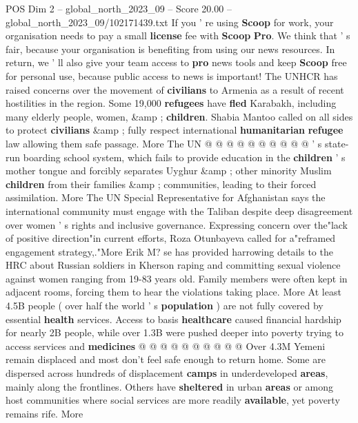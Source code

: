 \begin{textsample}{POS Dim 2 – global\_north\_2023\_09 – Score 20.00 – global\_north\_2023\_09/102171439.txt}
If you ' re using \textbf{Scoop} for work, your organisation needs to pay a small \textbf{license} fee with \textbf{Scoop} \textbf{Pro}.
We think that ' s fair, because your organisation is benefiting from using our news resources.
In return, we ' ll also give your team access to \textbf{pro} news tools and keep \textbf{Scoop} free for personal use, because public access to news is important!
The UNHCR has raised concerns over the movement of \textbf{civilians} to Armenia as a result of recent hostilities in the region.
Some 19,000 \textbf{refugees} have \textbf{fled} Karabakh, including many elderly people, women, \&amp ; \textbf{children}.
Shabia Mantoo called on all sides to protect \textbf{civilians} \&amp ; fully respect international \textbf{humanitarian} \textbf{refugee} law allowing them safe passage.
More The UN @ @ @ @ @ @ @ @ @ @ ' s state-run boarding school system, which fails to provide education in the \textbf{children} ' s mother tongue and forcibly separates Uyghur \&amp ; other minority Muslim \textbf{children} from their families \&amp ; communities, leading to their forced assimilation.
More The UN Special Representative for Afghanistan says the international community must engage with the Taliban despite deep disagreement over women ' s rights and inclusive governance.
Expressing concern over the"lack of positive direction"in current efforts, Roza Otunbayeva called for a"reframed engagement strategy,."More Erik M? se has provided harrowing details to the HRC about Russian soldiers in Kherson raping and committing sexual violence against women ranging from 19-83 years old.
Family members were often kept in adjacent rooms, forcing them to hear the violations taking place.
More At least 4.5B people ( over half the world ' s \textbf{population} ) are not fully covered by essential \textbf{health} services.
Access to basis \textbf{healthcare} caused financial hardship for nearly 2B people, while over 1.3B were pushed deeper into poverty trying to access services and \textbf{medicines} @ @ @ @ @ @ @ @ @ @ Over 4.3M Yemeni remain displaced and most don't feel safe enough to return home.
Some are dispersed across hundreds of displacement \textbf{camps} in underdeveloped \textbf{areas}, mainly along the frontlines.
Others have \textbf{sheltered} in urban \textbf{areas} or among host communities where social services are more readily \textbf{available}, yet poverty remains rife.
More

\end{textsample}

